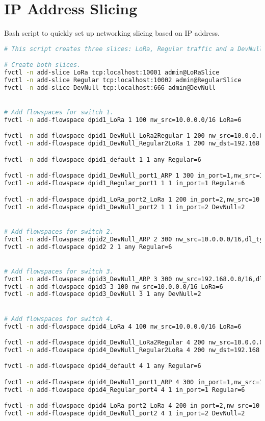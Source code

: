 \chapter{IP Address Slicing} \label{annex:ip_slicing}
Bash script to quickly set up networking slicing based on IP address.

\begin{lstlisting}[language=bash]
# This script creates three slices: LoRa, Regular traffic and a DevNull slice to drop packets.

# Create both slices.
fvctl -n add-slice LoRa tcp:localhost:10001 admin@LoRaSlice
fvctl -n add-slice Regular tcp:localhost:10002 admin@RegularSlice
fvctl -n add-slice DevNull tcp:localhost:666 admin@DevNull


# Add flowspaces for switch 1.
fvctl -n add-flowspace dpid1_LoRa 1 100 nw_src=10.0.0.0/16 LoRa=6

fvctl -n add-flowspace dpid1_DevNull_LoRa2Regular 1 200 nw_src=10.0.0.0/16,nw_dst=192.168.0.0/16 DevNull=2
fvctl -n add-flowspace dpid1_DevNull_Regular2LoRa 1 200 nw_dst=192.168.0.0/16,nw_src=10.0.0.0/16 DevNull=2

fvctl -n add-flowspace dpid1_default 1 1 any Regular=6

fvctl -n add-flowspace dpid1_DevNull_port1_ARP 1 300 in_port=1,nw_src=10.0.0.0/16,dl_type=0x0806 DevNull=6
fvctl -n add-flowspace dpid1_Regular_port1 1 1 in_port=1 Regular=6

fvctl -n add-flowspace dpid1_LoRa_port2_LoRa 1 200 in_port=2,nw_src=10.0.0.0/16 LoRa=6
fvctl -n add-flowspace dpid1_DevNull_port2 1 1 in_port=2 DevNull=2


# Add flowspaces for switch 2.
fvctl -n add-flowspace dpid2_DevNull_ARP 2 300 nw_src=10.0.0.0/16,dl_type=0x0806 DevNull=6
fvctl -n add-flowspace dpid2 2 1 any Regular=6


# Add flowspaces for switch 3.
fvctl -n add-flowspace dpid3_DevNull_ARP 3 300 nw_src=192.168.0.0/16,dl_type=0x0806 DevNull=6
fvctl -n add-flowspace dpid3 3 100 nw_src=10.0.0.0/16 LoRa=6
fvctl -n add-flowspace dpid3_DevNull 3 1 any DevNull=2


# Add flowspaces for switch 4.
fvctl -n add-flowspace dpid4_LoRa 4 100 nw_src=10.0.0.0/16 LoRa=6

fvctl -n add-flowspace dpid4_DevNull_LoRa2Regular 4 200 nw_src=10.0.0.0/16,nw_dst=192.168.0.0/16 DevNull=2
fvctl -n add-flowspace dpid4_DevNull_Regular2LoRa 4 200 nw_dst=192.168.0.0/16,nw_src=10.0.0.0/16 DevNull=2

fvctl -n add-flowspace dpid4_default 4 1 any Regular=6

fvctl -n add-flowspace dpid4_DevNull_port1_ARP 4 300 in_port=1,nw_src=10.0.0.0/16,dl_type=0x0806 DevNull=6
fvctl -n add-flowspace dpid4_Regular_port4 4 1 in_port=1 Regular=6

fvctl -n add-flowspace dpid4_LoRa_port2_LoRa 4 200 in_port=2,nw_src=10.0.0.0/16 LoRa=6
fvctl -n add-flowspace dpid4_DevNull_port2 4 1 in_port=2 DevNull=2
\end{lstlisting}